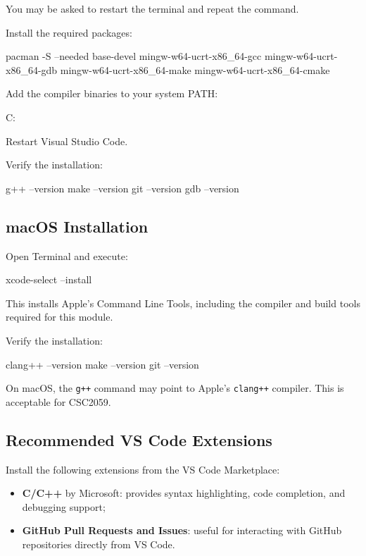 \documentclass{csc2059practical}
\begin{document}
You may be asked to restart the terminal and repeat the command.

Install the required packages:

\begin{bashcode}
pacman -S --needed base-devel mingw-w64-ucrt-x86_64-gcc mingw-w64-ucrt-x86_64-gdb mingw-w64-ucrt-x86_64-make mingw-w64-ucrt-x86_64-cmake
\end{bashcode}

Add the compiler binaries to your system PATH:

\begin{terminal}
C:\Apps{}\bin
\end{terminal}

Restart Visual Studio Code.

Verify the installation:

\begin{bashcode}
g++ --version
make --version
git --version
gdb --version
\end{bashcode}

\subsection{macOS Installation}

Open Terminal and execute:

\begin{bashcode}
xcode-select --install
\end{bashcode}

This installs Apple's Command Line Tools, including the compiler and build tools required for this module.

Verify the installation:

\begin{bashcode}
clang++ --version
make --version
git --version
\end{bashcode}

\begin{tipbox}
On macOS, the \texttt{g++} command may point to Apple's \texttt{clang++} compiler. This is acceptable for CSC2059.
\end{tipbox}

\subsection{Recommended VS Code Extensions}

Install the following extensions from the VS Code Marketplace:

\begin{itemize}
  \item \textbf{C/C++} by Microsoft: provides syntax highlighting, code completion, and debugging support;
  \item \textbf{GitHub Pull Requests and Issues}: useful for interacting with GitHub repositories directly from VS Code.
\end{itemize}
\end{document}
